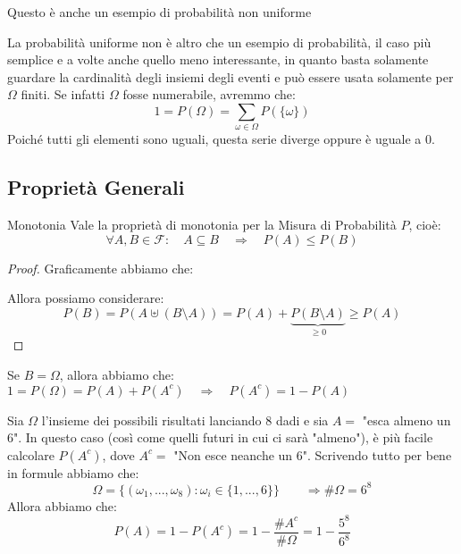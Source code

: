 \documentclass[11pt, a4paper, twoside]{article}
\begin{document}
Questo è anche un esempio di probabilità non uniforme

\begin{oss}
	La probabilità uniforme non è altro che un esempio di probabilità, il caso più semplice e a volte anche quello meno interessante, in quanto basta solamente guardare la cardinalità degli insiemi degli eventi e può essere usata solamente per $\Omega$ finiti. Se infatti $\Omega$ fosse numerabile, avremmo che:
	\[ 1 = P(\Omega) = \sum_{\omega \in \Omega}P(\{\omega\}) \]
	Poiché tutti gli elementi sono uguali, questa serie diverge oppure è uguale a $0$.
\end{oss}

\subsection{Proprietà Generali}

\begin{prop}{Monotonia}{}
	Vale la proprietà di monotonia per la Misura di Probabilità $P$, cioè:
	\[ \forall A,B \in \mathcal F: \quad A \subseteq B \quad \Rightarrow \quad P(A)\leq P(B) \]
\end{prop}
\begin{proof} %
	Graficamente abbiamo che:
	\begin{center}
	\end{center}
	Allora possiamo considerare:
	\[ P(B) = P(A \uplus (B\setminus A)) = P(A) + \underbrace{P(B\setminus A)}_{\geq 0} \geq P(A) \]
\end{proof}

\begin{oss}
	Se $B = \Omega$, allora abbiamo che:
	$1= P(\Omega) = P(A) + P(A^c) \quad \Rightarrow \quad P(A^c) = 1-P(A)$
\end{oss}

\begin{es}
	Sia $\Omega$ l'insieme dei possibili risultati lanciando $8$ dadi e sia $A= $ "esca almeno un $6$". In questo caso (così come quelli futuri in cui ci sarà "almeno"), è più facile calcolare $P(A^c)$, dove $A^c =$ "Non esce neanche un $6$". Scrivendo tutto per bene in formule abbiamo che:
	\[ \Omega = \{(\omega_1,...,\omega_8): \omega_i \in \{1,...,6\}\} \qquad \Rightarrow \# \Omega = 6^8\]
	Allora abbiamo che:
	\[ P(A) = 1-P(A^c) = 1 - \frac{\# A^c}{\# \Omega} = 1 - \frac{5^8}{6^8} \]
\end{es}
\end{document}
